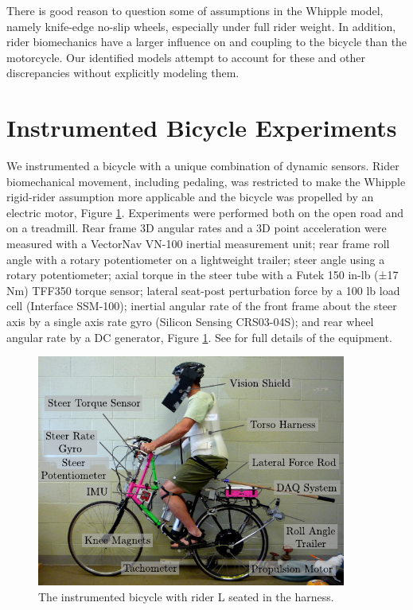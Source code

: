 \documentclass[a4paper]{article}
\begin{document}
There is good reason to question some of assumptions in the Whipple model,
namely knife-edge no-slip wheels, especially under full rider weight. In
addition, rider biomechanics have a larger influence on and coupling to the
bicycle than the motorcycle. Our identified models attempt to account for these
and other discrepancies without explicitly modeling them.

\section*{Instrumented Bicycle Experiments}

We instrumented a bicycle with a unique combination of dynamic sensors. Rider
biomechanical movement, including pedaling, was restricted to make the Whipple
rigid-rider assumption more applicable and the bicycle was propelled by an
electric motor, Figure \ref{fig:instrumented-bicycle}. Experiments were
performed both on the open road and on a treadmill. Rear frame 3D angular rates
and a 3D point acceleration were measured with a VectorNav VN-100 inertial
measurement unit; rear frame roll angle with a rotary potentiometer on a
lightweight trailer; steer angle using a rotary potentiometer; axial torque in
the steer tube with a Futek 150 in-lb (±17 Nm) TFF350 torque sensor; lateral
seat-post perturbation force by a 100 lb load cell (Interface SSM-100);
inertial angular rate of the front frame about the steer axis by a single axis
rate gyro (Silicon Sensing CRS03-04S); and rear wheel angular rate by a DC
generator, Figure \ref{fig:instrumented-bicycle}. See \cite{Moore2012} for full
details of the equipment.

\begin{figure}
  \label{fig:instrumented-bicycle}
  \centering
  \includegraphics[width=4in]{figures/instrumented-bicycle.pdf}
  \caption{The instrumented bicycle with rider L seated in the harness.}
\end{figure}
\end{document}
